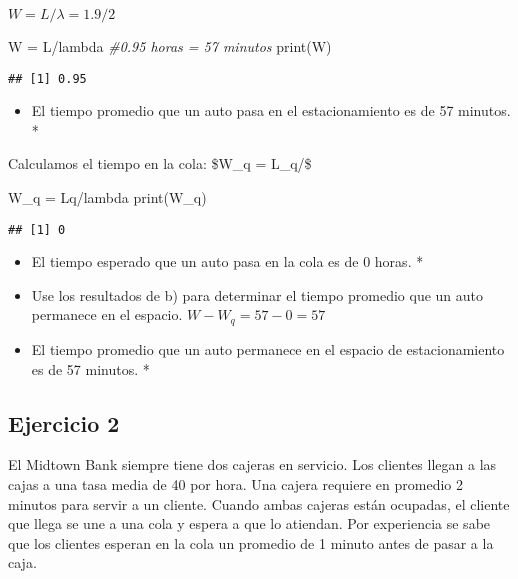 \documentclass[
]{article}
\newenvironment{Shaded}{\begin{snugshade}}{\end{snugshade}}
\newcommand{\CommentTok}[1]{\textcolor[rgb]{0.56,0.35,0.01}{\textit{#1}}}
\newcommand{\FunctionTok}[1]{\textcolor[rgb]{0.00,0.00,0.00}{#1}}
\newcommand{\NormalTok}[1]{#1}
\newcommand{\OtherTok}[1]{\textcolor[rgb]{0.56,0.35,0.01}{#1}}
\newcommand{\SpecialCharTok}[1]{\textcolor[rgb]{0.00,0.00,0.00}{#1}}
\providecommand{\tightlist}{%
  \setlength{\itemsep}{0pt}\setlength{\parskip}{0pt}}
\begin{document}
\(W = L /\lambda = 1.9/2\)

\begin{Shaded}
\begin{Highlighting}[]
\NormalTok{W }\OtherTok{=}\NormalTok{ L}\SpecialCharTok{/}\NormalTok{lambda }\CommentTok{\#0.95 horas = 57 minutos}
\FunctionTok{print}\NormalTok{(W)}
\end{Highlighting}
\end{Shaded}

\begin{verbatim}
## [1] 0.95
\end{verbatim}

\begin{itemize}
\tightlist
\item
  El tiempo promedio que un auto pasa en el estacionamiento es de 57
  minutos. *
\end{itemize}

Calculamos el tiempo en la cola: \$W\_q = L\_q/\lambda \$

\begin{Shaded}
\begin{Highlighting}[]
\NormalTok{W\_q }\OtherTok{=}\NormalTok{ Lq}\SpecialCharTok{/}\NormalTok{lambda}
\FunctionTok{print}\NormalTok{(W\_q)}
\end{Highlighting}
\end{Shaded}

\begin{verbatim}
## [1] 0
\end{verbatim}

\begin{itemize}
\item
  El tiempo esperado que un auto pasa en la cola es de 0 horas. *
\item
  Use los resultados de b) para determinar el tiempo promedio que un
  auto permanece en el espacio. \(W - W_q = 57 - 0 = 57\)
\item
  El tiempo promedio que un auto permanece en el espacio de
  estacionamiento es de 57 minutos. *
\end{itemize}

\hypertarget{ejercicio-2}{%
\subsection{Ejercicio 2}\label{ejercicio-2}}

El Midtown Bank siempre tiene dos cajeras en servicio. Los clientes
llegan a las cajas a una tasa media de 40 por hora. Una cajera requiere
en promedio 2 minutos para servir a un cliente. Cuando ambas cajeras
están ocupadas, el cliente que llega se une a una cola y espera a que lo
atiendan. Por experiencia se sabe que los clientes esperan en la cola un
promedio de 1 minuto antes de pasar a la caja.
\end{document}
